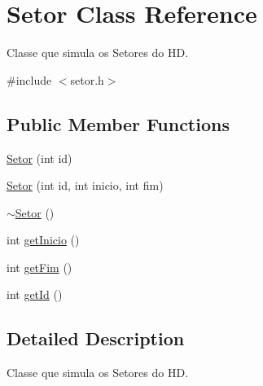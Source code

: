 \hypertarget{classSetor}{\section{Setor Class Reference}
\label{classSetor}
}


Classe que simula os Setores do H\+D.  




{\ttfamily \#include $<$setor.\+h$>$}

\subsection*{Public Member Functions}
\begin{DoxyCompactItemize}
\item 
\hyperlink{classSetor_ad547a9f194a2cb2d763371f16c42e99e}{Setor} (int id)
\item 
\hyperlink{classSetor_a5ab13049bf55eddc4586212567a936ed}{Setor} (int id, int inicio, int fim)
\item 
\hyperlink{classSetor_a742f6569bc474de138faa8f2c9897b17}{$\sim$\+Setor} ()
\item 
int \hyperlink{classSetor_ae31a039bd0ac2d1c76802198abf8f076}{get\+Inicio} ()
\item 
int \hyperlink{classSetor_a5f46674630604f4ef6215985bbc97a9e}{get\+Fim} ()
\item 
int \hyperlink{classSetor_a3a86ea9d1832d230fb7abe4fafbe0bf5}{get\+Id} ()
\end{DoxyCompactItemize}


\subsection{Detailed Description}
Classe que simula os Setores do H\+D. 

